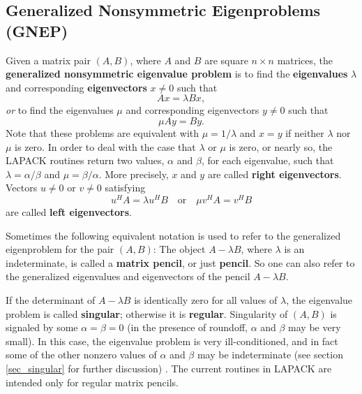 \subsection{Generalized Nonsymmetric Eigenproblems (GNEP)}
\label{sec_gnep_driver}

Given a matrix pair $(A, B)$, where $A$ and $B$ are square $n \times n$
matrices, the {\bf generalized nonsymmetric eigenvalue problem} is to find
the {\bf eigenvalues} $\lambda$  and corresponding
{\bf eigenvectors} 
$x \not= 0$ such that
\[
        A x = \lambda B x ,
\]
{\it or} to find the eigenvalues $\mu$ and corresponding eigenvectors
$y \not= 0$ such that
\[
        \mu A y = B y.
\]
Note that these problems are equivalent with $\mu = 1/\lambda$ and $x=y$
if neither $\lambda$ nor $\mu$ is zero.  In order to deal with the case
that $\lambda$ or $\mu$ is zero, or nearly so, the LAPACK routines return
two values, $\alpha$ and $\beta$, for each eigenvalue, such that
$\lambda = \alpha/\beta$ and $\mu = \beta/\alpha$.
More precisely, $x$ and $y$ are called {\bf right eigenvectors}.
Vectors $u \not= 0$ or $v \not= 0$ satisfying
\[
        u^H A = \lambda u^H B \quad\mbox{or}\quad \mu v^H A = v^H B
\]
are called {\bf left eigenvectors}.

Sometimes the following equivalent notation is used to refer to the
generalized eigenproblem for the pair $(A,B)$: The object $A - \lambda B$,
where $\lambda$ is an indeterminate, is called a {\bf matrix pencil}, or
just {\bf pencil}.
So one can also refer to the generalized eigenvalues
and eigenvectors of the pencil $A - \lambda B$.

If the determinant of $A - \lambda B$ is identically
zero for all values of $\lambda$,
the eigenvalue problem is called {\bf singular}; otherwise it is {\bf regular}.
Singularity of $(A,B)$ is signaled by some $\alpha = \beta = 0$
(in the presence of roundoff, $\alpha$ and $\beta$ may be very small).
In this case, the eigenvalue problem is very ill-conditioned,
and in fact some of the other nonzero values of $\alpha$
and $\beta$ may be indeterminate (see section \ref{sec_singular} for further
discussion) \cite{stewart72,wilkinson79,demmelkagstrom87}.
The current routines in LAPACK are intended only for regular matrix pencils.

